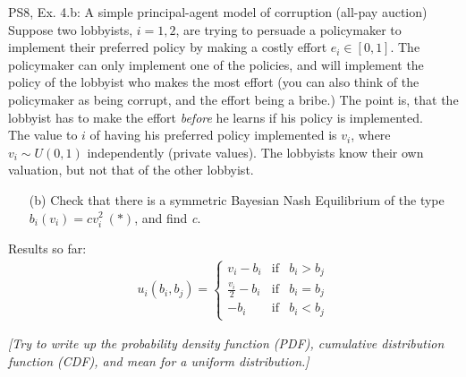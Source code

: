 \begin{frame}{PS8, Ex. 4.b: A simple principal-agent model of corruption (all-pay auction)}
    Suppose two lobbyists, $i = 1, 2$, are trying to persuade a policymaker to implement their preferred policy by making a costly effort $e_i\in[0, 1]$. The policymaker can only implement one of the policies, and will implement the policy of the lobbyist who makes the most effort (you can also think of the policymaker as being corrupt, and the effort being a bribe.) The point is, that the lobbyist has to make the effort \textit{before} he learns if his policy is implemented.\\\medskip
    The value to $i$ of having his preferred policy implemented is $v_i$, where $v_i\sim U(0, 1)$ independently (private values). The lobbyists know their own valuation, but not that of the other lobbyist.
    \begin{itemize}
      \item[(b)] Check that there is a symmetric Bayesian Nash Equilibrium of the type $b_i(v_i) = cv_i^2\ (*)$, and find \textit{c}.
    \end{itemize} \vspace{-8pt}
    \begin{multicols}{2}
      \vfill\null\columnbreak
      Results so far: \vspace{-6pt}
      \begin{align*}
        u_i(b_i,b_j)=\left\{\begin{array}{lcl}
          v_i-b_i           & \text{if} & b_i>b_j \\
          \frac{v_i}{2}-b_i & \text{if} & b_i=b_j \\
          -b_i              & \text{if} & b_i<b_j
        \end{array}\right.
      \end{align*}
      \vfill\null
    \end{multicols}
    \textit{[Try to write up the probability density function (PDF), cumulative distribution function (CDF), and mean for a uniform distribution.]}
\end{frame}
